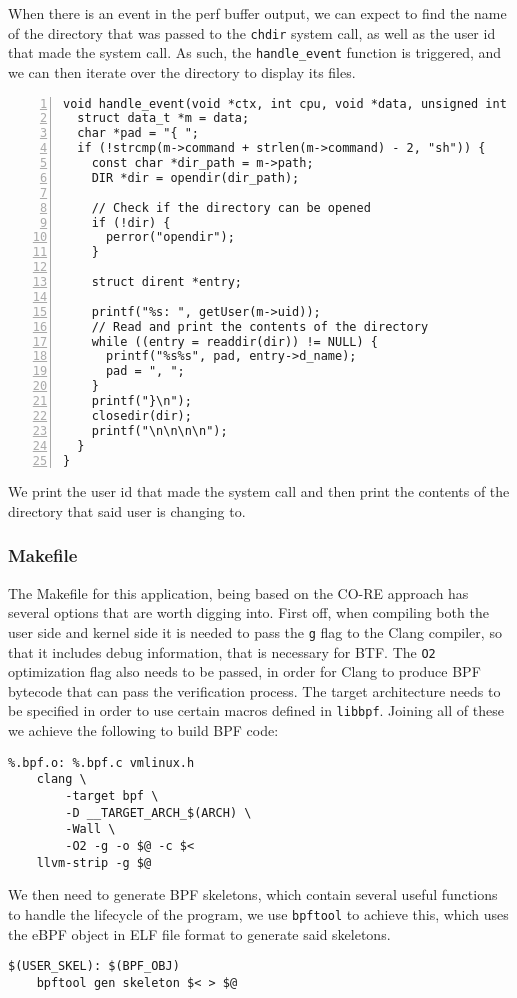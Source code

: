 When there is an event in the perf buffer output, we can expect to find the name of the directory that was passed to the \texttt{chdir} system call, as well as the user id that made the system call. As such, the \texttt{handle\_event} function is triggered, and we can then iterate over the directory to display its files.
\begin{lstlisting}[numbers=left]
void handle_event(void *ctx, int cpu, void *data, unsigned int data_sz) {
  struct data_t *m = data;
  char *pad = "{ ";
  if (!strcmp(m->command + strlen(m->command) - 2, "sh")) {
    const char *dir_path = m->path;
    DIR *dir = opendir(dir_path);

    // Check if the directory can be opened
    if (!dir) {
      perror("opendir");
    }

    struct dirent *entry;

    printf("%s: ", getUser(m->uid));
    // Read and print the contents of the directory
    while ((entry = readdir(dir)) != NULL) {
      printf("%s%s", pad, entry->d_name);
      pad = ", ";
    }
    printf("}\n");
    closedir(dir);
    printf("\n\n\n\n");
  }
}
\end{lstlisting}
We print the user id that made the system call and then print the contents of the directory that said user is changing to.


\subsubsection{Makefile}
The Makefile for this application, being based on the CO-RE approach has several options that are worth digging into.
First off, when compiling both the user side and kernel side it is needed to pass the \texttt{\-g} flag to the Clang compiler, so that it includes debug information, that is necessary for BTF. The \texttt{\-O2} optimization flag also needs to be passed, in order for Clang to produce BPF bytecode that can pass the verification process. The target architecture needs to be specified in order to use certain macros defined in \texttt{libbpf}. Joining all of these we achieve the following to build BPF code:
\begin{lstlisting}
%.bpf.o: %.bpf.c vmlinux.h
	clang \
	    -target bpf \
        -D __TARGET_ARCH_$(ARCH) \
	    -Wall \
	    -O2 -g -o $@ -c $<
	llvm-strip -g $@
\end{lstlisting}

We then need to generate BPF skeletons, which contain several useful functions to handle the lifecycle of the program, we use \texttt{bpftool} to achieve this, which uses the eBPF object in ELF file format to generate said skeletons.
\begin{lstlisting}
$(USER_SKEL): $(BPF_OBJ)
	bpftool gen skeleton $< > $@
\end{lstlisting}

